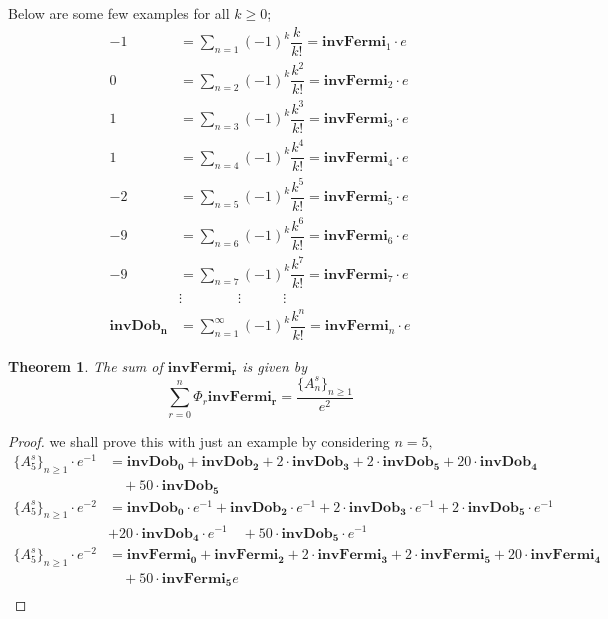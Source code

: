 \documentclass[pdflatex,sn-mathphys-num]{sn-jnl}%
\newtheorem{theorem}{Theorem}
\theoremstyle{thmstyleone}%
\theoremstyle{thmstyletwo}%
\theoremstyle{thmstylethree}%
\begin{document}
Below are some few examples for all $k\geq 0$;
\begin{align*}
    -1&=\sum_{n=1}(-1)^k\dfrac{k}{k!}=\mathbf{invFermi}_1\cdotp e\\ \nonumber
   0&=\sum_{n=2}(-1)^k\dfrac{k^2}{k!}=\mathbf{invFermi}_2\cdotp e\\ \nonumber
    1&=\sum_{n=3}(-1)^k\dfrac{k^3}{k!}=\mathbf{invFermi}_3\cdotp e\\ \nonumber
    1&=\sum_{n=4}(-1)^k\dfrac{k^4}{k!}=\mathbf{invFermi}_4\cdotp e\\ \nonumber
   -2&= \sum_{n=5}(-1)^k\dfrac{k^5}{k!}=\mathbf{invFermi}_5\cdotp e\\ \nonumber
  -9&= \sum_{n=6}(-1)^k\dfrac{k^6}{k!}=\mathbf{invFermi}_6\cdotp e\\ \nonumber
   -9&= \sum_{n=7}(-1)^k\dfrac{k^7}{k!}=\mathbf{invFermi}_7\cdotp e \\ \nonumber
     &\vdots \quad \quad \quad \quad \vdots \quad \quad \quad\vdots \quad \quad \quad \quad \quad \quad \quad\\
    \mathbf{invDob_{n}}&=\sum_{n=1}^{\infty}(-1)^k\dfrac{k^n}{k!}=\mathbf{invFermi}_{n}\cdotp e
\end{align*}

\begin{theorem}
The sum of $\mathbf{invFermi_r}$ is given by
$$\sum_{r=0}^{n} \Phi_r \mathbf{invFermi_r}=\dfrac{\lbrace A_n^s\rbrace_{n\geq 1}}{ e^{2}}$$
\end{theorem}
\begin{proof} we shall prove this with just an example by considering $n=5,$
    \begin{align*}
\lbrace A_5^s\rbrace_{n\geq 1}\cdotp e^{-1}&=\mathbf{invDob_0} + \mathbf{invDob_2} + 2\cdotp \mathbf{invDob_3} +2\cdotp \mathbf{invDob_5} + 20\cdotp \mathbf{invDob_4} \\
&\quad + 50\cdotp \mathbf{invDob_{5}}\\
\lbrace A_5^s\rbrace_{n\geq 1}\cdotp e^{-2}&=\mathbf{invDob_0}\cdotp e^{-1} + \mathbf{invDob_2}\cdotp e^{-1} + 2\cdotp \mathbf{invDob_3}\cdotp e^{-1} +2\cdotp \mathbf{invDob_5}\cdotp e^{-1} \\
&+ 20\cdotp \mathbf{invDob_4}\cdotp e^{-1} 
\quad + 50\cdotp \mathbf{invDob_{5}}\cdotp e^{-1}\\
\lbrace A_5^s\rbrace_{n\geq 1}\cdotp e^{-2}&=\mathbf{invFermi_0} + \mathbf{invFermi_2} + 2\cdotp \mathbf{invFermi_3} +2\cdotp \mathbf{invFermi_5} + 20\cdotp \mathbf{invFermi_4}\\
&\quad   + 50\cdotp \mathbf{invFermi_{5}}e\\
\end{align*}
\end{proof}
\end{document}
